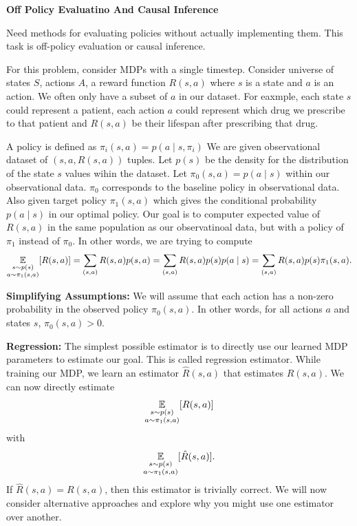 \documentclass[12pt,letterpaper,boxed]{hmcpset}
\begin{document}
\begin{problem}[Problem 2]
  \textbf{Off Policy Evaluatino And Causal Inference}

  Need methods for evaluating policies without actually implementing them. This task is off-policy evaluation or causal inference.

  For this problem, consider MDPs with a single timestep. Consider universe of states $S$, actions $A$, a reward function $R(s, a)$ where $s$ is a state and $a$ is an action. We often only have a subset of $a$ in our dataset. For eaxmple, each state $s$ could represent a patient, each action $a$ could represent which drug we prescribe to that patient and $R(s, a)$ be their lifespan after prescribing that drug.

  A policy is defined as $\pi_i (s, a) = p(a \mid s, \pi_i)$ We are given observational dataset of $(s, a, R(s, a))$ tuples. Let $p(s)$ be the density for the distribution of the state $s$ values wihin the dataset. Let $\pi_0 (s, a) = p(a \mid s)$ within our observational data. $\pi_0$ corresponds to the baseline policy in observational data. Also given target policy $\pi_1 (s,a)$ which gives the conditional probability $p(a \mid s)$ in our optimal policy. Our goal is to computer expected value of $R(s,a)$ in the same population as our observatinoal data, but with a policy of $\pi_1$ instead of $\pi_0$. In other words, we are trying to compute
  \[
  \operatorname*{\mathbb{E}}_{\substack{s \sim p(s) \\ a \sim \pi_1(s,a)}} [R(s, a)] = \sum_{(s,a)} R(s,a) p(s,a) = \sum_{(s,a)} R(s,a) p(s) p(a \mid s) = \sum_{(s,a)} R(s,a) p(s) \pi_1 (s,a).
  \]

  \textbf{Simplifying Assumptions: } We will assume that each action has a non-zero probability in the observed policy $\pi_0 (s, a)$. In other words, for all actions $a$ and states $s$, $\pi_0 (s,a) > 0$.

  \textbf{Regression:} The simplest possible estimator is to directly use our learned MDP parameters to estimate our goal. This is called regression estimator. While training our MDP, we learn an estimator $\hat R(s,a)$ that estimates $R(s,a)$. We can now directly estimate
  \[
  \operatorname*{\mathbb{E}}_{\substack{s \sim p(s) \\ a \sim \pi_1(s,a)}} [R(s, a)]
  \]
  with 
  \[
    \operatorname*{\mathbb{E}}_{\substack{s \sim p(s) \\ a \sim \pi_1(s,a)}} [\hat R(s, a)].
  \]
  If $\hat R(s,a) = R(s,a)$, then this estimator is trivially correct. We will now consider alternative approaches and explore why you might use one estimator over another.
\end{problem}
\end{document}
